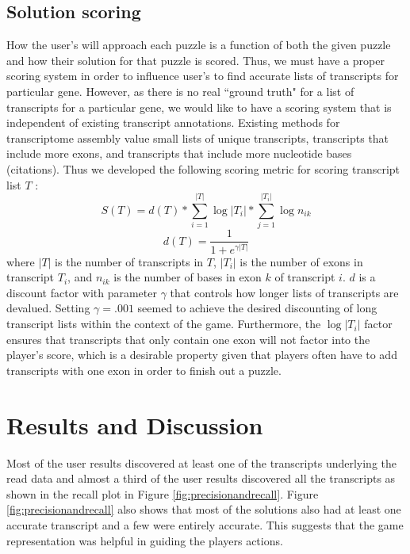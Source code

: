 \documentclass[12pt]{article}
\begin{document}
\subsection*{Solution scoring}
\label{sec:scoring}
How the user's will approach each puzzle is a function of both the given puzzle and how their solution for that puzzle is scored. Thus, we must have
a proper scoring system in order to influence user's to find accurate lists of transcripts for particular gene. However, as there is no real ``ground truth"
for a list of transcripts for a particular gene, we would like to have a scoring system that is independent of existing transcript annotations. Existing methods
for transcriptome assembly value small lists of unique transcripts, transcripts that include more exons, and transcripts that include more nucleotide bases (citations).
Thus we developed the following scoring metric for scoring transcript list $T$ :
\begin{equation*}
S(T) = d(T) * \sum_{i=1}^{|T|} \log{|T_i|} * \sum_{j = 1}^{|T_i|} \log{n_{ik}}
\end{equation*}
\begin{equation*}
d(T) = \frac{1}{1+e^{\gamma |T|}}
\end{equation*}
where $|T|$ is the number of transcripts in $T$, $|T_i|$ is the number of exons in transcript $T_i$, and $n_{ik}$ is the number of bases in exon $k$ of transcript $i$.
$d$ is a discount factor with parameter $\gamma$ that controls how longer lists of transcripts are devalued. Setting $\gamma = .001$ seemed to achieve the desired
discounting of long transcript lists within the context of the game. Furthermore, the $\log{|T_i|}$ factor ensures that transcripts that only contain one exon will not factor
into the player's score, which is a desirable property given that players often have to add transcripts with one exon in order to finish out a puzzle.

\section*{Results and Discussion}
Most of the user results discovered at least one of the transcripts underlying the read data and almost a third of the user results discovered all the transcripts as shown in the recall plot in Figure \ref{fig:precisionandrecall}. Figure \ref{fig:precisionandrecall} also shows that most of the solutions also had at least one accurate transcript and a few were entirely accurate. This suggests that the game representation was helpful in guiding the players actions. 
\end{document}

